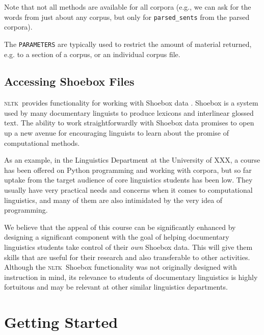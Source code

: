 \documentclass[11pt]{article}
\newcommand{\NLTK}{\textsc{nltk}}
\newcommand{\code}[1]{\texttt{\small #1}}
\begin{document}
Note that not all methods are available for all corpora (e.g., we can
ask for the words from just about any corpus, but only for
\code{parsed\_sents} from the parsed corpora).

The \code{PARAMETERS} are typically used to restrict the amount of material returned,
e.g. to a section of a corpus, or an individual corpus file.

\subsection{Accessing Shoebox Files}

\NLTK\ provides functionality for working with Shoebox data
\cite{robinson:etal:2007}. Shoebox is a system used by many
documentary linguists to produce lexicons and interlinear glossed text.  The
ability to work straightforwardly with Shoebox data promises to open
up a new avenue for encouraging linguists to learn about the promise
of computational methods. 

As an example, in the Linguistics Department at the University of
XXX, a course has been offered on Python programming and
working with corpora, but so far uptake from the
target audience of core linguistics students has been low. They usually have very
practical needs and concerns when it comes to computational
linguistics, and many of them are also intimidated by the very idea of
programming. %

We believe that the appeal of this course can be significantly
enhanced by designing a significant component
with the goal of helping documentary linguistics students take control of their
\emph{own} Shoebox data. This will give them  skills that are
useful for their research and also transferable to other activities.
Although the \NLTK\ Shoebox functionality was not
originally designed with instruction in mind, its relevance to
students of documentary linguistics is highly fortuitous and
may be relevant at other similar linguistics departments.

\section{Getting Started}
\label{sec:getting-started}
\end{document}
